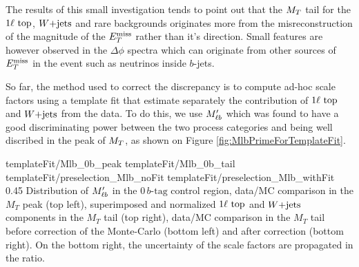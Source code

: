     The results of this small investigation tends to point out that the $M_T$ tail for
    the $1\ell~\text{top}$, $\text{$W$+jets}$ and rare backgrounds originates more from the 
    misreconstruction of the magnitude of the $E_T^\text{miss}$ rather than it's direction. Small
    features are however observed in the $\Delta \phi$ spectra which can originate from
    other sources of $E_T^\text{miss}$ in the event such as neutrinos inside $b$-jets.

    So far, the method used to correct the discrepancy is to compute ad-hoc scale factors
    using a template fit that estimate separately the contribution of $1\ell~\text{top}$ and 
    $\text{$W$+jets}$ from the data. To do this, we use $M'_{\ell b}$ which was found to have a good 
    discriminating power between the two process categories and being well discribed in 
    the peak of $M_T$, as shown on Figure \ref{fig:MlbPrimeForTemplateFit}.

                          {templateFit/Mlb_0b_peak}
                          {templateFit/Mlb_0b_tail}
                          {templateFit/preselection_Mlb_noFit}
                          {templateFit/preselection_Mlb_withFit}
                          {0.45}
                          {Distribution of $M'_{\ell b}$ in the $0\, b\text{-tag}$ control region, data/MC comparison in the $M_T$ peak (top left), superimposed and normalized $1\ell~\text{top}$ and $\text{$W$+jets}$ components in the $M_T$ tail (top right), data/MC comparison in the $M_T$ tail before correction of the Monte-Carlo (bottom left) and after correction (bottom right). On the bottom right, the uncertainty of the scale factors are propagated in the ratio.}

